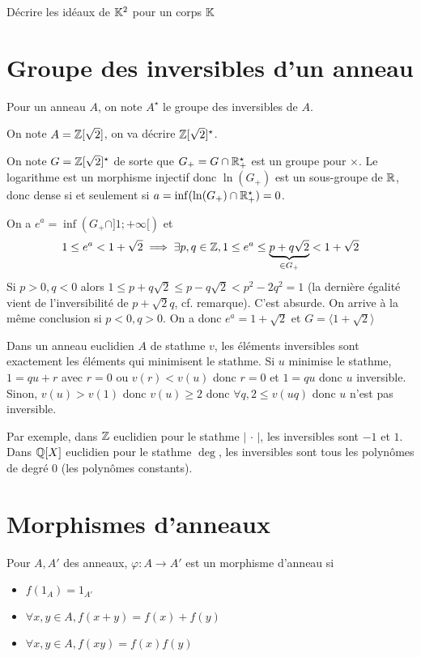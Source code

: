 \begin{exo}
    Décrire les idéaux de $\mathbb K^2$ pour un corps $\mathbb K$
\end{exo}

\section{Groupe des inversibles d'un anneau}

Pour un anneau $A$, on note $A^\star$ le groupe des inversibles de $A$.

\begin{ex}
    On note $A=\mathbb Z[\sqrt 2]$, on va décrire $\mathbb Z[\sqrt 2]^\star$.

    On note $G=\mathbb Z[\sqrt 2]^\star$ de sorte que $G_+=G\cap \mathbb R_+^\star$ est un groupe pour $\times$. Le logarithme est un morphisme injectif donc $\ln(G_+)$ est un sous-groupe de $\mathbb R$, donc dense si et seulement si $a=\inf (\ln(G_+)\cap \mathbb R_+^\star)=0$.

    On a $e^a=\inf(G_+\cap ]1; +\infty[)$ et \[
        1\leq e^a< 1+\sqrt 2 \implies \exists p,q \in \mathbb Z, 1\leq e^a\leq \underbrace{p+q\sqrt 2}_{\in G_+}< 1+\sqrt 2
    \]
    Si $p>0, q<0$ alors $1\leq p+q\sqrt 2\leq p-q\sqrt 2<p^2-2q^2=1$ (la dernière égalité vient de l'inversibilité de $p+\sqrt2 q$, cf. remarque). C'est absurde. On arrive à la même conclusion si $p<0, q>0$. On a donc $e^a=1+\sqrt 2$ et $G=\langle 1+\sqrt 2 \rangle$
\end{ex}

\begin{rem}
    Dans un anneau euclidien $A$ de stathme $v$, les éléments inversibles sont exactement les éléments qui minimisent le stathme. Si $u$ minimise le stathme, $1=qu+r$ avec $r=0$ ou $v(r)<v(u)$ donc $r=0$ et $1=qu$ donc $u$ inversible. Sinon, $v(u)>v(1)$ donc $v(u)\geq 2$ donc $\forall q, 2\leq v(uq)$ donc $u$ n'est pas inversible.

    Par exemple, dans $\mathbb Z$ euclidien pour le stathme $|\,\cdot\,|$, les inversibles sont $-1$ et $1$. Dans $\mathbb Q[X]$ euclidien pour le stathme $\deg$, les inversibles sont tous les polynômes de degré $0$ (les polynômes constants).
\end{rem}

\section{Morphismes d'anneaux}

\begin{dfn}
    Pour $A, A'$ des anneaux, $\varphi:A\to A'$ est un morphisme d'anneau si \begin{itemize}
        \item $f(1_A)=1_{A'}$
        \item $\forall x, y\in A, f(x+y)=f(x)+f(y)$
        \item $\forall x, y\in A, f(xy)=f(x)f(y)$
    \end{itemize}
\end{dfn}

